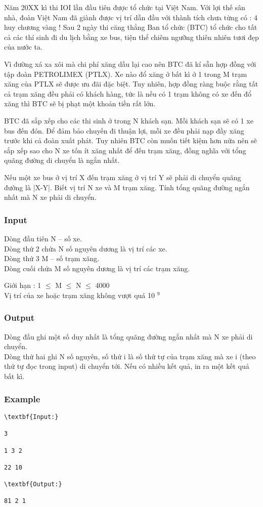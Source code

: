 



   Năm 20XX kì thi IOI lần đầu tiên được tổ chức tại Việt Nam. Với lợi thế sân nhà, đoàn Việt Nam đã giành được vị trí dẫn đầu với thành tích chưa từng có : 4 huy chương vàng ! Sau 2 ngày thi căng thẳng Ban tổ chức (BTC) tổ chức cho tất cả các thí sinh đi du lịch bằng xe bus, tiện thể chiêm ngưỡng thiên nhiên tươi đẹp của nước ta.  

   Vì đường xá xa xôi mà chi phí xăng dầu lại cao nên BTC đã kí sẵn hợp đồng với tập đoàn PETROLIMEX (PTLX). Xe nào đổ xăng ở bất kì ở 1 trong M trạm xăng của PTLX sẽ được ưu đãi đặc biệt. Tuy nhiên, hợp đồng ràng buộc rằng tất cả trạm xăng đều phải có khách hàng, tức là nếu có 1 trạm không có xe đến đổ xăng thì BTC sẽ bị phạt một khoản tiền rất lớn.  

   BTC đã sắp xếp cho các thi sinh ở trong N khách sạn. Mỗi khách sạn sẽ có 1 xe bus đến đón. Để đảm bảo chuyến đi thuận lợi, mỗi xe đều phải nạp đầy xăng trước khi cả đoàn xuất phát. Tuy nhiên BTC còn muốn tiết kiệm hơn nữa nên sẽ sắp xếp sao cho N xe tốn ít xăng nhất để đến trạm xăng, đồng nghĩa với tổng quãng đường di chuyển là ngắn nhất.  

   Nếu một xe bus ở vị trí X đến trạm xăng ở vị trí Y sẽ phải di chuyển quãng đường là |X-Y|. Biết vị trí N xe và M trạm xăng. Tính tổng quãng đường ngắn nhất mà N xe phải di chuyển.  

\subsubsection{   Input  }

   Dòng đầu tiên N – số xe.   
\\   Dòng thứ 2 chứa N số nguyên dương là vị trí các xe.   
\\   Dòng thứ 3 M – số trạm xăng.   
\\   Dòng cuối chứa M số nguyên dương là vị trí các trạm xăng.  

    Giới hạn :      1 $\le$  M  $\le$  N  $\le$  4000   
\\   Vị trí của xe hoặc trạm xăng không vượt quá 10   $^    9   $

\subsubsection{   Output  }

   Dòng đầu ghi một số duy nhất là tổng quãng đường ngắn nhất mà N xe phải di chuyển.   
\\   Dòng thứ hai ghi N số nguyên, số thứ i là số thứ tự của trạm xăng mà xe i (theo thứ tự đọc trong input) di chuyển tới. Nếu có nhiều kết quả, in ra một kết quả bất kì.  

\subsubsection{   Example  }
\begin{verbatim}
\textbf{Input:}

3

1 3 2

22 10

\textbf{Output:}

81 2 1 \end{verbatim}

